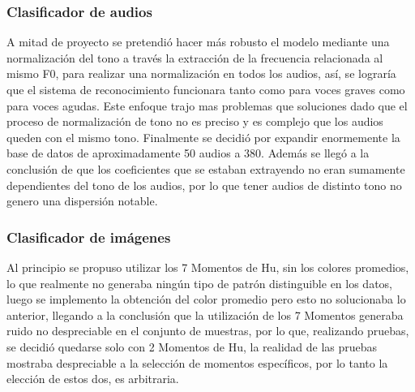 \documentclass[12pt,a4paper]{article}
\begin{document}
\subsubsection*{Clasificador de audios}
A mitad de proyecto se pretendió hacer más robusto el modelo mediante una normalización del tono a través la extracción de la frecuencia relacionada al mismo F0, para realizar una normalización en todos los audios, así, se lograría que el sistema de reconocimiento funcionara tanto como para voces graves como para voces agudas. Este enfoque trajo mas problemas que soluciones dado que el proceso de normalización de tono no es preciso y es complejo que los audios queden con el mismo tono. Finalmente se decidió por expandir enormemente la base de datos de aproximadamente 50 audios a 380. Además se llegó a la conclusión de que los coeficientes que se estaban extrayendo no eran sumamente dependientes del tono de los audios, por lo que tener audios de distinto tono no genero una dispersión notable.
\subsubsection*{Clasificador de imágenes}
Al principio se propuso utilizar los 7 Momentos de Hu, sin los colores promedios, lo que realmente no generaba ningún tipo de patrón distinguible en los datos, luego se implemento la obtención del color promedio pero esto no solucionaba lo anterior, llegando a la conclusión que la utilización de los 7 Momentos generaba ruido no despreciable en el conjunto de muestras, por lo que, realizando pruebas, se decidió quedarse solo con 2 Momentos de Hu, la realidad de las pruebas mostraba despreciable a la selección de momentos específicos, por lo tanto la elección de estos dos, es arbitraria.
\end{document}
